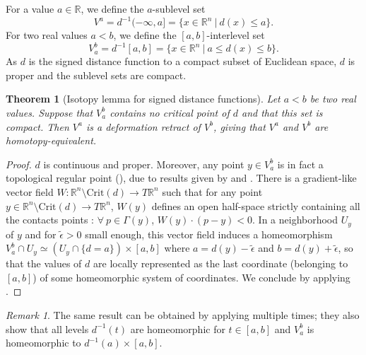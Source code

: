 \documentclass[11pt]{article}
\newcommand{\R}{\mathbb{R}}
\newcommand{\eps}{\epsilon}
\newcommand{\inter}{\cap}
\theoremstyle{plain}
\newtheorem{thm}{Theorem}
\theoremstyle{definition}
\theoremstyle{remark}
\newtheorem{rmk}{Remark}
\begin{document}
For a value $a \in \R$, we define the $a$-sublevel set
\[V^a = d^{-1}(-\infty,a] = \{ x \in \R^n ~|~ d(x) \leq a \}. \]
For two real values $a < b$, we define the $[a,b]$-interlevel set
\[ V_a^b = d^{-1}[a,b] = \{ x \in \R^n ~|~ a \leq d(x) \leq b \}.  \]
As $d$ is the signed distance function to a compact subset of Euclidean space, $d$ is proper and
the sublevel sets are compact.

\begin{thm}[Isotopy lemma for signed distance functions]
	\label{thm:dist_isotopy_lemma}
Let $a < b$ be two real values. Suppose that $V_a^b$ contains no critical point of $d$ and that this set is compact. 
Then $V^a$ is a deformation retract of $V^b$, giving that $V^a$ and $V^b$ are homotopy-equivalent.
\end{thm}
\begin{proof}

$d$ is continuous and proper. Moreover, any point $y \in V_a^b$ is in fact a topological regular point (), due to results given by \cite{cheeger_critical_1991} and \cite{grove_critical_1993}. There is a gradient-like vector field $W : \R^n \setminus \mathrm{Crit}(d) \to T\R^n$ such that for any point $y \in \R^n \setminus \mathrm{Crit}(d) \to T\R^n$, $W(y)$ defines an open half-space strictly containing all the contacts points : $\forall\ p \in \Gamma(y)$,
$W(y) \cdot (p-y) < 0$. In a neighborhood $U_y$ of $y$ and for $\tilde{\eps} > 0$ small enough, this vector field induces a homeomorphism $V_{a}^b \inter U_y \simeq (U_y \inter \{d = a\}) \times [a,b]$ where $a = d(y) - \tilde{\eps}$ and $b = d(y) + \tilde{\eps}$, so that the values of $d$ are locally represented as the last coordinate (belonging to $[a,b]$) of some homeomorphic system of coordinates. We conclude by applying .
\end{proof}

\begin{rmk}
The same result can be obtained by applying \cite[Proposition 1.8]{grove_critical_1993} multiple times; they also show that all levels $d^{-1}(t)$ are homeomorphic for $t \in [a,b]$ and $V_a^b$ is homeomorphic to $d^{-1}(a) \times [a,b]$.
\end{rmk}
\end{document}
